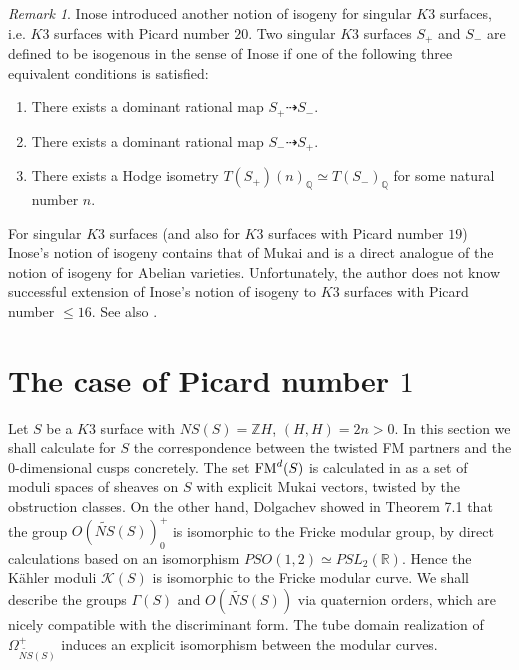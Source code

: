 \documentclass{article}
\theoremstyle{plain}
\theoremstyle{definition}
\theoremstyle{remark}
\newtheorem{remark}{Remark}%
\newcommand{\Z}{{\mathbb Z}}
\newcommand{\R}{{\mathbb R}}
\begin{document}
\begin{remark}
Inose \cite{In} introduced another notion of isogeny for singular $K3$ surfaces, 
i.e. $K3$ surfaces with Picard number $20$.  
Two singular $K3$ surfaces $S_{+}$ and $S_{-}$ are defined to be isogenous in the sense of Inose 
if one of the following three equivalent conditions is satisfied:    
\begin{enumerate}
 \item[(1)]    There exists a dominant rational map  $S_{+} \dashrightarrow S_{-}$.
 \item[(2)]    There exists a dominant rational map  $S_{-} \dashrightarrow S_{+}$.      
 \item[(3)]   There exists a Hodge isometry $T(S_{+})(n)_{{\mathbb Q}} \simeq  T(S_{-})_{{\mathbb Q}}$ for some natural number $n$.  
\end{enumerate} 
For singular $K3$ surfaces (and also for $K3$ surfaces with Picard number $19$) 
Inose's notion of isogeny contains that of Mukai 
and is a direct analogue of the notion of isogeny for Abelian varieties.  
Unfortunately,  the author does not know successful extension of Inose's notion of isogeny 
to $K3$ surfaces with Picard number  $\leq 16$.  
See also \cite{Ni2}. 
\end{remark}






\section{The case of Picard number $1$}\label{sec5} 





Let $S$ be a $K3$ surface with 
$NS(S)={\Z}H$, 
$(H, H)=2n>0$. 
In this section 
we shall calculate for $S$ 
the correspondence between 
the twisted FM partners 
and the $0$-dimensional cusps concretely.    
The set 
${\rm FM\/}^{d}(S)$ 
is calculated in \cite{Ma2} 
as a set of moduli spaces of sheaves on $S$ 
with explicit Mukai vectors, 
twisted by the obstruction classes. 
On the other hand, 
Dolgachev showed in \cite{Do} Theorem 7.1 that 
the group $O(\widetilde{NS}(S))_{0}^{+}$ is isomorphic to the Fricke modular group, 
by direct calculations based on an isomorphism 
$PSO(1, 2) \simeq PSL_{2}({\R})$. 
Hence the K\"ahler moduli $\mathcal{K} (S)$ is isomorphic to the Fricke modular curve.  
We shall describe the groups $\Gamma (S)$ and $O(\widetilde{NS}(S))$   
via quaternion orders, which are nicely compatible with the discriminant form.  
The tube domain realization of $\Omega _{\widetilde{NS}(S)}^{+}$ 
induces an explicit isomorphism between the modular curves.  
\end{document}
